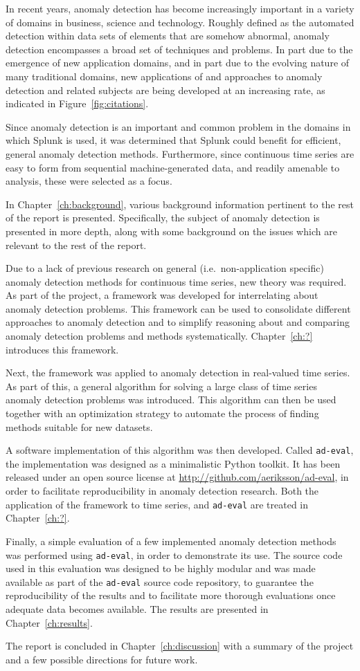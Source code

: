 In recent years, anomaly detection has become increasingly important in a variety of domains in business, science and technology. Roughly defined as the automated detection within data sets of elements that are somehow abnormal, anomaly detection encompasses a broad set of techniques and problems. In part due to the emergence of new application domains, and in part due to the evolving nature of many traditional domains, new applications of and approaches to anomaly detection and related subjects are being developed at an increasing rate, as indicated in Figure~\ref{fig:citations}.

Since anomaly detection is an important and common problem in the domains in which Splunk is used, it was determined that Splunk could benefit for efficient, general anomaly detection methods. Furthermore, since continuous time series are easy to form from sequential machine-generated data, and readily amenable to analysis, these were selected as a focus.

In Chapter~\ref{ch:background}, various background information pertinent to the rest of the report is presented. Specifically, the subject of anomaly detection is presented in more depth, along with some background on the issues which are relevant to the rest of the report.

Due to a lack of previous research on general (i.e.\ non-application specific) anomaly detection methods for continuous time series, new theory was required. As part of the project, a framework was developed for interrelating about anomaly detection problems. This framework can be used to consolidate different approaches to anomaly detection and to simplify reasoning about and comparing anomaly detection problems and methods systematically. Chapter~\ref{ch:?} introduces this framework.

Next, the framework was applied to anomaly detection in real-valued time series. As part of this, a general algorithm for solving a large class of time series anomaly detection problems was introduced. This algorithm can then be used together with an optimization strategy to automate the process of finding methods suitable for new datasets.

A software implementation of this algorithm was then developed. Called \texttt{ad-eval}, the implementation was designed as a minimalistic Python toolkit. It has been released under an open source license at \url{http://github.com/aeriksson/ad-eval}, in order to facilitate reproducibility in anomaly detection research. Both the application of the framework to time series, and \texttt{ad-eval} are treated in Chapter~\ref{ch:?}.

Finally, a simple evaluation of a few implemented anomaly detection methods was performed using \texttt{ad-eval}, in order to demonstrate its use. The source code used in this evaluation was designed to be highly modular and was made available as part of the \texttt{ad-eval} source code repository, to guarantee the reproducibility of the results and to facilitate more thorough evaluations once adequate data becomes available. The results are presented in Chapter~\ref{ch:results}.

The report is concluded in Chapter~\ref{ch:discussion} with a summary of the project and a few possible directions for future work.
